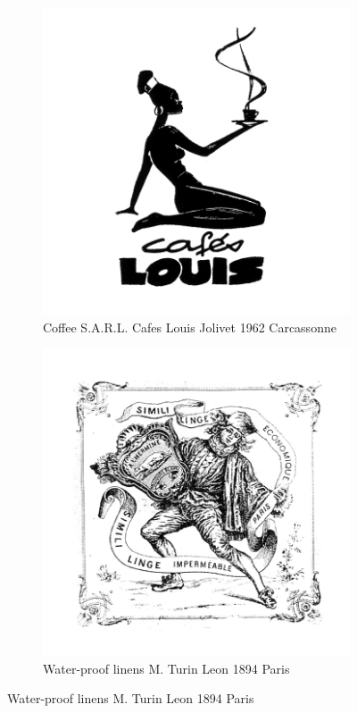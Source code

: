 \begin{figure}[h]
  \centering
  \begin{subfigure}{.45\textwidth}
    \centering
    \includegraphics[width=.5\linewidth]{images/supplement/trademarks/french/15_47}
    \caption{Coffee S.A.R.L. Cafes Louis Jolivet 1962 Carcassonne}
    \label{fig:trademarks:french:15.47}
  \end{subfigure}\hfill
  \begin{subfigure}{.45\textwidth}
    \centering
    \includegraphics[width=.5\linewidth]{images/supplement/trademarks/french/20_4}
    \caption{Water-proof linens M. Turin Leon 1894 Paris}
    \label{fig:trademarks:french:20.4}
  \end{subfigure}


\end{figure}
